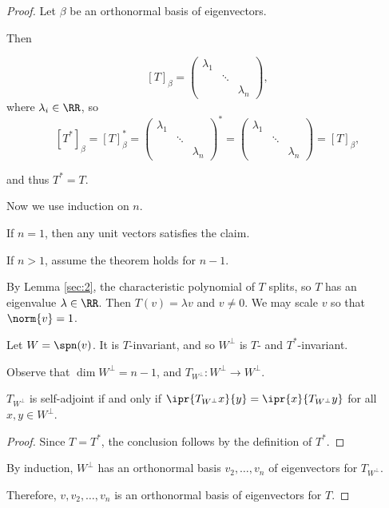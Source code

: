 \documentclass[11pt]{scrartcl}
\begin{document}
\begin{proof}
  \hfill

  Let $\beta$ be an orthonormal basis of eigenvectors.

  Then

  \[[T]_{\beta} = 
  \begin{pmatrix}
    \lambda_1           &        & \\
                        & \ddots & \\
                        &        & \lambda_{n}
                      \end{pmatrix},\]
                    where $\lambda_i\in\RR$, so
                    \[[T^{*}]_{\beta}=[T]^{*}_{\beta} = 
            \begin{pmatrix}
              \lambda_1 &        & \\
                        & \ddots & \\
                        &        & \lambda_n
                      \end{pmatrix}^{*} =
                      \begin{pmatrix}
                        \lambda_1 & &\\
                        & \ddots & \\
                        & & \lambda_n
                      \end{pmatrix} = [T]_{\beta},
                    \]

                    and thus $T^{*}=T$.

Now we use induction on $n$.
                    
If $n=1$, then any unit vectors satisfies the claim.

If $n>1$, assume the theorem holds for $n-1$.

By Lemma \ref{sec:2}, the characteristic polynomial of $T$ splits, so $T$ has an eigenvalue $\lambda\in \RR$. Then $T(v) = \lambda v$ and $v\neq 0$. We may scale $v$ so that $\norm{v}=1$.

Let $W = \spn(v)$. It is $T$-invariant, and so $W^{\bot}$ is $T$- and $T^{*}$-invariant.

Observe that $\dim W^{\bot} = n-1$, and $T_{W^{\bot}}:W^{\bot}\to W^{\bot}$.

\begin{claim*}
  $T_{W^{\bot}}$ is self-adjoint if and only if $\ipr{T_{W^{\bot}}x}{y} = \ipr{x}{T_{W^{\bot}}y}$ for all $x, y \in W^{\bot}$.
\end{claim*}
\begin{proof}
  \hfill

Since $T=T^{*}$, the conclusion follows by the definition of $T^{*}$.
\end{proof}

By induction, $W^{\bot}$ has an orthonormal basis $v_2, \dots, v_{n}$ of eigenvectors for $T_{W^{\bot}}$.

Therefore, $v, v_2, \dots, v_n$ is an orthonormal basis of eigenvectors for $T$.
\end{proof}
\end{document}

